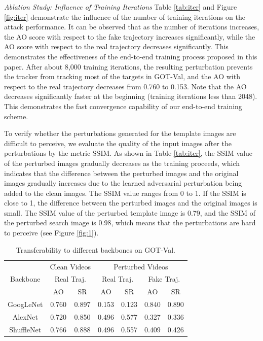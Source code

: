 \documentclass[journal]{IEEEtran}
\begin{document}
\textit{Ablation Study: Influence of Training Iterations} Table \ref{tab:iter} and Figure \ref{fig:iter} demonstrate the influence of the number of training iterations on the attack performance. It can be observed that as the number of iterations increases, the AO score with respect to the fake trajectory increases significantly, while the AO score with respect to the real trajectory decreases significantly. This demonstrates the effectiveness of the end-to-end training process proposed in this paper. After about 8,000 training iterations, the resulting perturbation prevents the tracker from tracking most of the targets in GOT-Val, and the AO with respect to the real trajectory decreases from 0.760 to 0.153. Note that the AO decreases significantly faster at the beginning (training iterations less than 2048). This demonstrates the fast convergence capability of our end-to-end training scheme.

To verify whether the perturbations generated for the template images are difficult to perceive, we evaluate the quality of the input images after the perturbations by the metric SSIM. As shown in Table \ref{tab:iter}, the SSIM value of the perturbed images gradually decreases as the training proceeds, which indicates that the difference between the perturbed images and the original images gradually increases due to the learned adversarial perturbation being added to the clean images. The SSIM value ranges from 0 to 1. If the SSIM is close to 1, the difference between the perturbed images and the original images is small. The SSIM value of the perturbed template image is 0.79, and the SSIM of the perturbed search image is 0.98, which means that the perturbations are hard to perceive (see Figure \ref{fig:1}).

\begin{table}
  \centering
  \caption{Transferability to different backbones on GOT-Val.}
  \begin{tabular}{c|cc|cc|cc} 
  \toprule
  \multirow{3}{*}[-6pt]{Backbone} & \multicolumn{2}{c|}{Clean Videos}    & \multicolumn{4}{c}{Perturbed Videos}                                        \\ 
  \cmidrule{2-7}
                            & \multicolumn{2}{c|}{Real Traj.} & \multicolumn{2}{c|}{Real Traj.} & \multicolumn{2}{c}{Fake Traj.}  \\ 
  \cmidrule{2-7}
                            & AO    & SR                           & AO    & SR                           & AO    & SR                           \\ 
  \midrule
  GoogLeNet                 & 0.760 & 0.897                        & 0.153 & 0.123                        & 0.840 & 0.890                        \\
  AlexNet                   & 0.720 & 0.850                        & 0.496 & 0.577                        & 0.327 & 0.336                        \\
  ShuffleNet                & 0.766 & 0.888                        & 0.496 & 0.557                        & 0.409 & 0.426                       \\
  \bottomrule
  \end{tabular}
  \label{tab:backbone}
\end{table}
\end{document}

